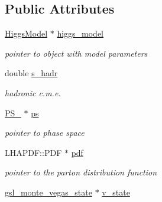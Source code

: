 \subsection*{Public Attributes}
\begin{DoxyCompactItemize}
\item 
\hypertarget{classintegrand__par_a9becf94ac239a82b946f53e36c75c83c}{\hyperlink{classHiggsModel}{Higgs\-Model} $\ast$ \hyperlink{classintegrand__par_a9becf94ac239a82b946f53e36c75c83c}{higgs\-\_\-model}}\label{classintegrand__par_a9becf94ac239a82b946f53e36c75c83c}

\begin{DoxyCompactList}\small\item\em pointer to object with model parameters \end{DoxyCompactList}\item 
\hypertarget{classintegrand__par_a02a52a8cc95edeadf423f181936617d0}{double \hyperlink{classintegrand__par_a02a52a8cc95edeadf423f181936617d0}{s\-\_\-hadr}}\label{classintegrand__par_a02a52a8cc95edeadf423f181936617d0}

\begin{DoxyCompactList}\small\item\em hadronic c.\-m.\-e. \end{DoxyCompactList}\item 
\hypertarget{classintegrand__par_a9c52a4045c079f7314cbc8a876f98238}{\hyperlink{classPS__2}{P\-S\-\_} $\ast$ \hyperlink{classintegrand__par_a9c52a4045c079f7314cbc8a876f98238}{ps}}\label{classintegrand__par_a9c52a4045c079f7314cbc8a876f98238}

\begin{DoxyCompactList}\small\item\em pointer to phase space \end{DoxyCompactList}\item 
\hypertarget{classintegrand__par_a082dc10e0e72baedade3f46cfffa4c15}{L\-H\-A\-P\-D\-F\-::\-P\-D\-F $\ast$ \hyperlink{classintegrand__par_a082dc10e0e72baedade3f46cfffa4c15}{pdf}}\label{classintegrand__par_a082dc10e0e72baedade3f46cfffa4c15}

\begin{DoxyCompactList}\small\item\em pointer to the parton distribution function \end{DoxyCompactList}\item 
\hypertarget{classintegrand__par_a3b5e2c8a2f3c33f0ebc594fd8f42210e}{\hyperlink{structgsl__monte__vegas__state}{gsl\-\_\-monte\-\_\-vegas\-\_\-state} $\ast$ \hyperlink{classintegrand__par_a3b5e2c8a2f3c33f0ebc594fd8f42210e}{v\-\_\-state}}\label{classintegrand__par_a3b5e2c8a2f3c33f0ebc594fd8f42210e}


\end{DoxyCompactItemize}

